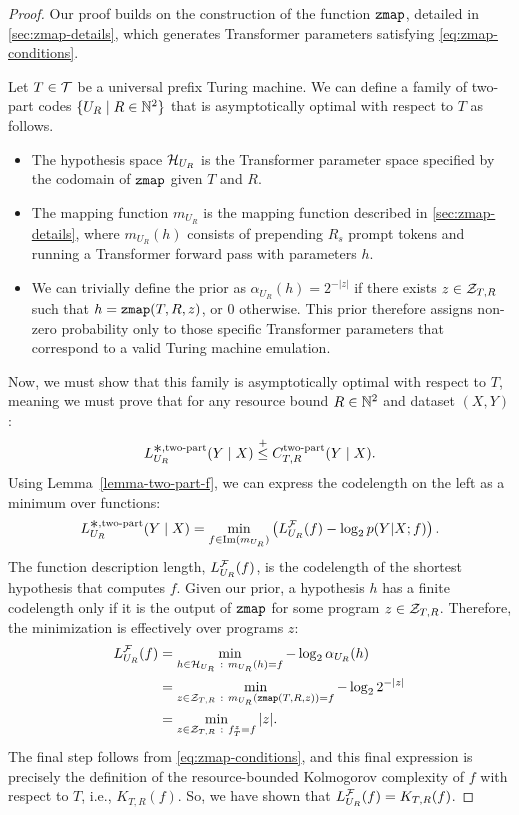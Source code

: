 \begin{proof}
Our proof builds on the construction of the function $\texttt{zmap}$, detailed in \ref{sec:zmap-details}, which generates Transformer parameters satisfying \eqref{eq:zmap-conditions}.

Let $T \in {\mathcal{T}}$ be a universal prefix Turing machine. We can define a family of two-part codes $\{ U_R \mid R \in {\mathbb{N}^2} \}$ that is asymptotically optimal with respect to $T$ as follows.
\begin{itemize}
    \item The hypothesis space ${\mathcal{H}}_{U_R}$ is the Transformer parameter space specified by the codomain of $\texttt{zmap}$ given $T$ and $R$.
    \item The mapping function $m_{U_R}$ is the mapping function described in \ref{sec:zmap-details}, where $m_{U_R}(h)$ consists of prepending $R_s$ prompt tokens and running a Transformer forward pass with parameters $h$. 
    \item We can trivially define the prior as $\alpha_{U_R}(h) = 2^{-|z|}$ if there exists $z \in {\mathcal{Z}}_{T,R}$ such that $h = \texttt{zmap}(T,R,z)$, or $0$ otherwise. This prior therefore assigns non-zero probability only to those specific Transformer parameters that correspond to a valid Turing machine emulation.
\end{itemize}

Now, we must show that this family is asymptotically optimal with respect to $T$, meaning we must prove that for any resource bound $R \in {\mathbb{N}^2}$ and dataset $(X,Y)$:
\begin{equation}
L^{\bigast,\text{two-part}}_{U_R}(Y \mid X) \leqc C^{\text{two-part}}_{T,R}(Y \mid X).
\end{equation}
Using Lemma~\ref{lemma-two-part-f}, we can express the codelength on the left as a minimum over functions:
\begin{equation}
 L^{\bigast,\text{two-part}}_{U_R}(Y \mid X) = \min_{f \in \mathrm{Im}(m_{U_R})} \left( L^\gF_{U_R}(f) - \log_2 p(Y|X;f) \right).
 \end{equation}
The function description length, $L^{\mathcal{F}}_{U_R}(f)$, is the codelength of the shortest hypothesis that computes $f$. Given our prior, a hypothesis $h$ has a finite codelength only if it is the output of $\texttt{zmap}$ for some program $z \in {\mathcal{Z}}_{T,R}$. Therefore, the minimization is effectively over programs $z$:
\begin{align*}
    L^{\mathcal{F}}_{U_R}(f) &= \min_{h \in {\mathcal{H}}_{U_R}  ~:~ m_{U_R}(h)=f}  -\log_2 \alpha_{U_R}(h) \\
    &= \min_{z \in {\mathcal{Z}}_{T,R}  ~:~ m_{U_R}(\texttt{zmap}(T,R,z))=f} -\log_2 2^{-|z|} \\
    &= \min_{z \in {\mathcal{Z}}_{T,R}  ~:~ f^z_T = f} |z|.
\end{align*}
The final step follows from \eqref{eq:zmap-conditions}, and this final expression is precisely the definition of the resource-bounded Kolmogorov complexity of $f$ with respect to $T$, i.e., $K_{T,R}(f)$. So, we have shown that $L^{\mathcal{F}}_{U_R}(f) = K_{T,R}(f)$.


\end{proof}
